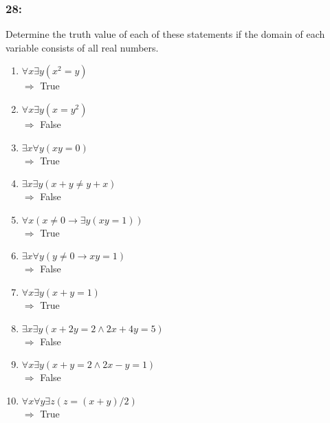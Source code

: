 \documentclass[12pt,en,a4paper]{report}
\begin{document}
	\subsubsection*{28:}
	Determine the truth value of each of these statements if the domain of each variable consists of all real numbers.
	\begin{enumerate}[label=\textbf{\alph*)}]
		\item $\forall x \exists y (x^2 = y)$\\
		$\Rightarrow$ True
		\item $\forall x \exists y (x=y^2)$\\
		$\Rightarrow$ False
		\item $\exists x \forall y (xy=0)$\\
		$\Rightarrow$ True
		\item $\exists x \exists y (x+y \neq y+x)$\\
		$\Rightarrow$ False
		\item $\forall x (x \neq 0 \rightarrow \exists y (xy=1))$\\
		$\Rightarrow$ True
		\item $\exists x \forall y (y \neq 0 \rightarrow xy=1)$\\
		$\Rightarrow$ False
		\item $\forall x \exists y (x+y=1)$\\
		$\Rightarrow$ True
		\item $\exists x \exists y (x+2y=2 \wedge 2x+4y=5)$\\
		$\Rightarrow$ False
		\item $\forall x \exists y (x+y=2 \wedge 2x-y=1)$\\
		$\Rightarrow$ False
		\item $\forall x \forall y \exists z (z=(x+y)/2)$\\
		$\Rightarrow$ True
	\end{enumerate}
\end{document}
